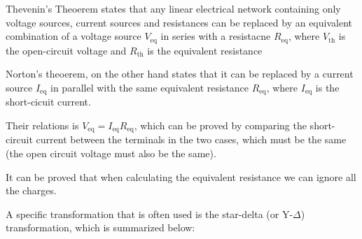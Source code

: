 \documentclass[english,a4paper,12pt]{report}
\begin{document}
Thevenin's Theoerem states that any linear electrical network containing only voltage sources, current sources and resistances can be replaced by an equivalent combination of a voltage source \(V_{\text{eq} } \) in series with a resistacne \(R_{\text{eq} } \), where \(V_{\text{th} } \) is the open-circuit voltage and \(R_{\text{th} } \) is the equivalent resistance

Norton's theoerem, on the other hand states that it can be replaced by a current source \(I_{\text{eq} } \) in parallel with the same equivalent resistance \(R_{\text{eq} } \), where \(I_{\text{eq} } \) is the short-cicuit current.

Their relations is \(V_{\text{eq} } = I_{\text{eq} }R_{\text{eq} }\), which can be proved by comparing the short-circuit current between the terminals in the two cases, which must be the same (the open circuit voltage must also be the same). 

It can be proved that when calculating the equivalent resistance we can ignore all the charges.

A specific transformation that is often used is the star-delta (or Y-\(\Delta \)) transformation, which is summarized below:

\begin{center}
\end{center}
    
\end{document}
